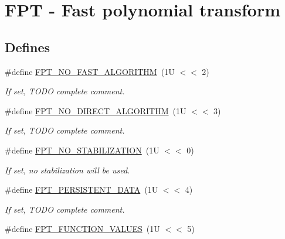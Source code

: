 \hypertarget{group__fpt}{
\section{FPT - Fast polynomial transform}
\label{group__fpt}
}
\subsection*{Defines}
\begin{CompactItemize}
\item 
\hypertarget{group__fpt_ga8}{
\#define \hyperlink{group__fpt_ga8}{FPT\_\-NO\_\-FAST\_\-ALGORITHM}~(1U $<$$<$ 2)}
\label{group__fpt_ga8}

\begin{CompactList}\small\item\em If set, TODO complete comment. \item\end{CompactList}\item 
\hypertarget{group__fpt_ga9}{
\#define \hyperlink{group__fpt_ga9}{FPT\_\-NO\_\-DIRECT\_\-ALGORITHM}~(1U $<$$<$ 3)}
\label{group__fpt_ga9}

\begin{CompactList}\small\item\em If set, TODO complete comment. \item\end{CompactList}\item 
\hypertarget{group__fpt_ga10}{
\#define \hyperlink{group__fpt_ga10}{FPT\_\-NO\_\-STABILIZATION}~(1U $<$$<$ 0)}
\label{group__fpt_ga10}

\begin{CompactList}\small\item\em If set, no stabilization will be used. \item\end{CompactList}\item 
\hypertarget{group__fpt_ga11}{
\#define \hyperlink{group__fpt_ga11}{FPT\_\-PERSISTENT\_\-DATA}~(1U $<$$<$ 4)}
\label{group__fpt_ga11}

\begin{CompactList}\small\item\em If set, TODO complete comment. \item\end{CompactList}\item 
\hypertarget{group__fpt_ga12}{
\#define \hyperlink{group__fpt_ga12}{FPT\_\-FUNCTION\_\-VALUES}~(1U $<$$<$ 5)}
\label{group__fpt_ga12}


\end{CompactItemize}
